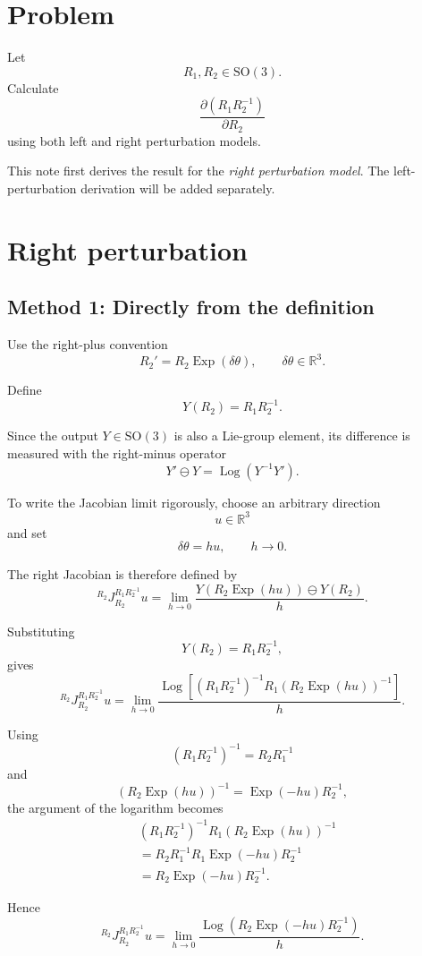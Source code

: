 \documentclass[11pt]{article}
\newcommand{\Exp}{\operatorname{Exp}}
\newcommand{\Log}{\operatorname{Log}}
\newcommand{\SO}{\mathrm{SO}}
\newcommand{\R}{\mathbb{R}}
\begin{document}
\section*{Problem}

Let
\[
R_1,R_2\in\SO(3).
\]
Calculate
\[
\boxed{
\frac{\partial(R_1R_2^{-1})}{\partial R_2}
}
\]
using both left and right perturbation models.

This note first derives the result for the \emph{right perturbation model}.
The left-perturbation derivation will be added separately.

\section{Right perturbation}

\subsection{Method 1: Directly from the definition}

Use the right-plus convention
\[
R_2' = R_2\Exp(\delta\theta),
\qquad
\delta\theta\in\R^3.
\]

Define
\[
Y(R_2)=R_1R_2^{-1}.
\]

Since the output $Y\in\SO(3)$ is also a Lie-group element, its
difference is measured with the right-minus operator
\[
Y'\ominus Y=\Log(Y^{-1}Y').
\]

To write the Jacobian limit rigorously, choose an arbitrary direction
\[
u\in\R^3
\]
and set
\[
\delta\theta=hu,
\qquad h\to0.
\]

The right Jacobian is therefore defined by
\[
\boxed{
{}^{R_2}J_{R_2}^{R_1R_2^{-1}}u
=
\lim_{h\to0}
\frac{
Y(R_2\Exp(hu))\ominus Y(R_2)
}{h}.
}
\tag{1}
\]

Substituting
\[
Y(R_2)=R_1R_2^{-1},
\]
gives
\[
{}^{R_2}J_{R_2}^{R_1R_2^{-1}}u
=
\lim_{h\to0}
\frac{
\Log\!\left[
(R_1R_2^{-1})^{-1}
R_1(R_2\Exp(hu))^{-1}
\right]
}{h}.
\tag{2}
\]

Using
\[
(R_1R_2^{-1})^{-1}=R_2R_1^{-1}
\]
and
\[
(R_2\Exp(hu))^{-1}
=
\Exp(-hu)R_2^{-1},
\]
the argument of the logarithm becomes
\begin{align}
&(R_1R_2^{-1})^{-1}
R_1(R_2\Exp(hu))^{-1}
\\
&=
R_2R_1^{-1}
R_1
\Exp(-hu)R_2^{-1}
\\
&=
R_2\Exp(-hu)R_2^{-1}.
\end{align}

Hence
\[
{}^{R_2}J_{R_2}^{R_1R_2^{-1}}u
=
\lim_{h\to0}
\frac{
\Log\!\left(
R_2\Exp(-hu)R_2^{-1}
\right)
}{h}.
\tag{3}
\]
\end{document}
